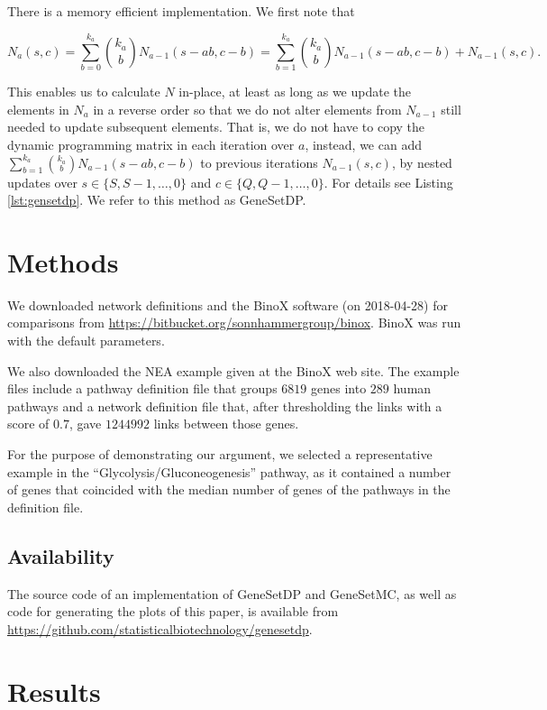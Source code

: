 \documentclass[10pt,letterpaper]{article}
\begin{document}
There is a memory efficient implementation. We first note that

\[
N_a(s,c)=\sum_{b=0}^{k_a}{k_a \choose b} N_{a-1}(s-ab,c-b)=\sum_{b=1}^{k_a}{k_a \choose b} N_{a-1}(s-ab,c-b) + N_{a-1}(s,c).
\]


This enables us to calculate $N$ in-place, at least as long as we update the elements in $N_a$ in a reverse order so that we do not alter elements from $N_{a-1}$ still needed to update subsequent elements. That is, we do not have to copy the dynamic programming matrix in each iteration over $a$, instead, we can add $\sum_{b=1}^{k_a}{k_a \choose b} N_{a-1}(s-ab,c-b)$ to previous iterations $N_{a-1}(s,c)$, by nested updates over $s \in \{ S, S-1, \ldots, 0 \}$ and $c \in \{ Q, Q-1, \ldots, 0 \}$. For details see Listing \ref{lst:gensetdp}. We refer to this method as GeneSetDP.

\section*{Methods}

We downloaded network definitions and the BinoX software (on 2018-04-28) for comparisons from \url{https://bitbucket.org/sonnhammergroup/binox}. BinoX was run with the default parameters.

We also downloaded the NEA example given at the BinoX web site. The example files include a pathway definition file that groups $6819$ genes into $289$ human pathways and a network definition file that, after thresholding the links with a score of $0.7$, gave $1244992$ links between those genes.

For the purpose of demonstrating our argument, we selected a representative example in the ``Glycolysis/Gluconeogenesis'' pathway, as it contained a number of genes that coincided with the median number of genes of the pathways in the definition file.

\subsection*{Availability}

The source code of an implementation of GeneSetDP and GeneSetMC, as well as code for generating the plots of this paper, is available from \url{https://github.com/statisticalbiotechnology/genesetdp}.

\section*{Results}
\end{document}
